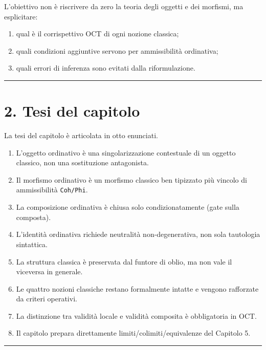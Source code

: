 L'obiettivo non è riscrivere da zero la teoria degli oggetti e dei morfismi, ma esplicitare:

\begin{enumerate}
\def\labelenumi{\arabic{enumi}.}
\tightlist
\item
  qual è il corrispettivo OCT di ogni nozione classica;
\item
  quali condizioni aggiuntive servono per ammissibilità ordinativa;
\item
  quali errori di inferenza sono evitati dalla riformulazione.
\end{enumerate}

\begin{center}\rule{0.5\linewidth}{0.5pt}\end{center}

\section{2. Tesi del capitolo}

La tesi del capitolo è articolata in otto enunciati.

\begin{enumerate}
\def\labelenumi{\arabic{enumi}.}
\tightlist
\item
  L'oggetto ordinativo è una singolarizzazione contestuale di un oggetto classico, non una sostituzione antagonista.
\item
  Il morfismo ordinativo è un morfismo classico ben tipizzato più vincolo di ammissibilità \texttt{Coh/Phi}.
\item
  La composizione ordinativa è chiusa solo condizionatamente (gate sulla composta).
\item
  L'identità ordinativa richiede neutralità non-degenerativa, non sola tautologia sintattica.
\item
  La struttura classica è preservata dal funtore di oblio, ma non vale il viceversa in generale.
\item
  Le quattro nozioni classiche restano formalmente intatte e vengono rafforzate da criteri operativi.
\item
  La distinzione tra validità locale e validità composita è obbligatoria in OCT.
\item
  Il capitolo prepara direttamente limiti/colimiti/equivalenze del Capitolo 5.
\end{enumerate}

\begin{center}\rule{0.5\linewidth}{0.5pt}\end{center}

